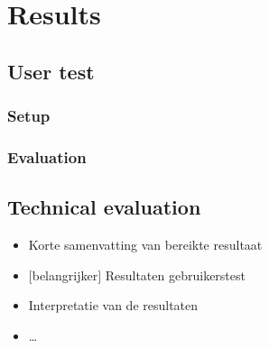 \chapter{Results}


\section{User test}

\subsection{Setup}

\subsection{Evaluation}

\section{Technical evaluation}

\begin{itemize}
\item Korte samenvatting van bereikte resultaat
\item $[$belangrijker$]$ Resultaten gebruikerstest
\item Interpretatie van de resultaten
\item \ldots
\end{itemize}